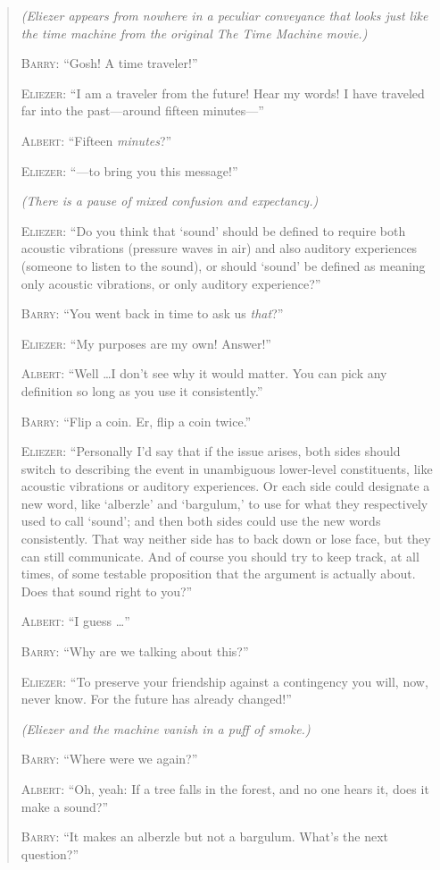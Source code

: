 \begin{quotation}
{
 \textit{(Eliezer appears from nowhere in a peculiar conveyance
that looks just like the time machine from the original The Time
Machine movie.)}}

{
 \textsc{Barry}: ``Gosh! A time
traveler!''}

{
 \textsc{Eliezer}: ``I am a traveler from the future! Hear
my words! I have traveled far into the past---around fifteen
minutes---''}

{
 \textsc{Albert}: ``Fifteen
\textit{minutes}?''}

{
 \textsc{Eliezer}: ``---to bring you this
message!''}

{
 \textit{(There is a pause of mixed confusion and expectancy.)}}

{
 \textsc{Eliezer}: ``Do you think that
`sound' should be defined to require
both acoustic vibrations (pressure waves in air) and also auditory
experiences (someone to listen to the sound), or should
`sound' be defined as meaning only
acoustic vibrations, or only auditory experience?''}

{
 \textsc{Barry}: ``You went back in time to ask us
\textit{that}?''}

{
 \textsc{Eliezer}: ``My purposes are my own!
Answer!''}

{
 \textsc{Albert}: ``Well \ldots I don't see
why it would matter. You can pick any definition so long as you use it
consistently.''}

{
 \textsc{Barry}: ``Flip a coin. Er, flip a coin
twice.''}

{
 \textsc{Eliezer}: ``Personally I'd say
that if the issue arises, both sides should switch to describing the
event in unambiguous lower-level constituents, like acoustic vibrations
or auditory experiences. Or each side could designate a new word, like
`alberzle' and
`bargulum,' to use for what they
respectively used to call `sound'; and
then both sides could use the new words consistently. That way neither
side has to back down or lose face, but they can still communicate. And
of course you should try to keep track, at all times, of some testable
proposition that the argument is actually about. Does that sound right
to you?''}

{
 \textsc{Albert}: ``I guess \ldots''}

{
 \textsc{Barry}: ``Why are we talking about
this?''}

{
 \textsc{Eliezer}: ``To preserve your friendship against a
contingency you will, now, never know. For the future has already
changed!''}

{
 \textit{(Eliezer and the machine vanish in a puff of smoke.)}}

{
 \textsc{Barry}: ``Where were we
again?''}

{
 \textsc{Albert}: ``Oh, yeah: If a tree falls in the
forest, and no one hears it, does it make a sound?''}

{
 \textsc{Barry}: ``It makes an alberzle but not a bargulum.
What's the next question?''}
\end{quotation}

